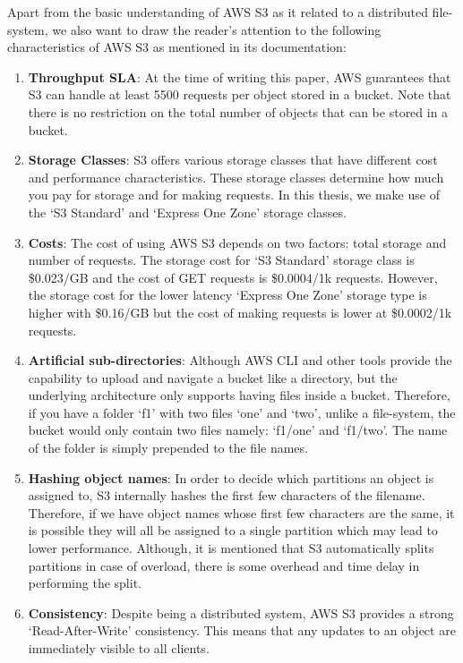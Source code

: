 \medskip
Apart from the basic understanding of AWS S3 as it related to a distributed
file-system, we also want to draw the reader's attention to the following
characteristics of AWS S3 as mentioned in its documentation:
\begin{enumerate}
    \item \textbf{Throughput SLA}: At the time of writing this paper, AWS
        guarantees that S3 can handle at least 5500 requests per object stored
        in a bucket. Note that there is no restriction on the total number of
        objects that can be stored in a bucket.
    \item \textbf{Storage Classes}: S3 offers various storage classes that have
        different cost and performance characteristics. These storage classes
        determine how much you pay for storage and for making requests. In this
        thesis, we make use of the `S3 Standard' and `Express One Zone' storage
        classes.
    \item \textbf{Costs}: The cost of using AWS S3 depends on two factors: total
        storage and number of requests. The storage cost for `S3 Standard'
        storage class is \$0.023/GB and the cost of GET requests is
        \$0.0004/1k requests. However, the storage cost for the lower latency
        `Express One Zone' storage type is higher with \$0.16/GB but the cost of making
        requests is lower at \$0.0002/1k requests. 
    \item \textbf{Artificial sub-directories}: Although AWS CLI and other tools
        provide the capability to upload and navigate a bucket like a directory,
        but the underlying architecture only supports having files inside a
        bucket. Therefore, if you have a folder `f1' with two files `one' and
        `two', unlike a file-system, the bucket would only contain two files
        namely: `f1/one' and `f1/two'. The name of the folder is simply
        prepended to the file names.
    \item \textbf{Hashing object names}: In order to decide which partitions an
        object is assigned to, S3 internally hashes the first few characters of
        the filename. Therefore, if we have object names whose first few
        characters are the same, it is possible they will all be assigned to a
        single partition which may lead to lower performance. Although, it is
        mentioned that S3 automatically splits partitions in case of overload,
        there is some overhead and time delay in performing the split.
    \item \textbf{Consistency}: Despite being a distributed system, AWS S3
        provides a strong `Read-After-Write' consistency. This means that any
        updates to an object are immediately visible to all clients.
\end{enumerate}

